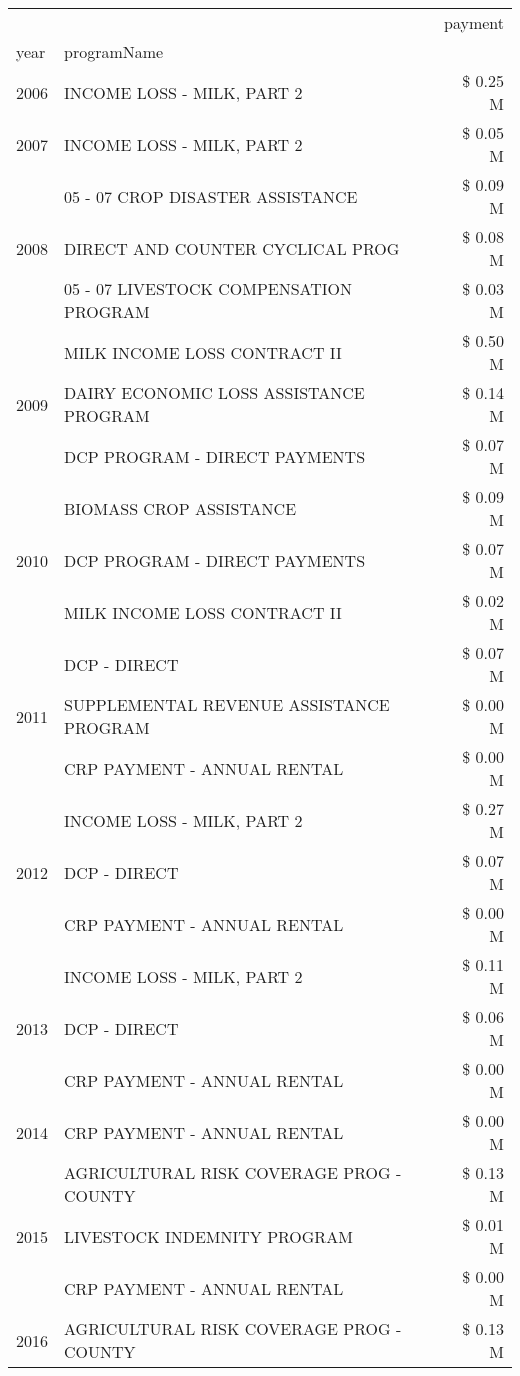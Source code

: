 \begin{tabular}{llr}
\toprule
 &  & payment \\
year & programName &  \\
\midrule
2006 & INCOME LOSS - MILK, PART 2 & \$ 0.25 M \\
\cline{1-3}
2007 & INCOME LOSS - MILK, PART 2 & \$ 0.05 M \\
\cline{1-3}
\multirow[t]{3}{*}{2008} & 05 - 07 CROP DISASTER ASSISTANCE & \$ 0.09 M \\
 & DIRECT AND COUNTER CYCLICAL PROG & \$ 0.08 M \\
 & 05 - 07 LIVESTOCK COMPENSATION PROGRAM & \$ 0.03 M \\
\cline{1-3}
\multirow[t]{3}{*}{2009} & MILK INCOME LOSS CONTRACT II & \$ 0.50 M \\
 & DAIRY ECONOMIC LOSS ASSISTANCE PROGRAM & \$ 0.14 M \\
 & DCP PROGRAM - DIRECT PAYMENTS & \$ 0.07 M \\
\cline{1-3}
\multirow[t]{3}{*}{2010} & BIOMASS CROP ASSISTANCE & \$ 0.09 M \\
 & DCP PROGRAM - DIRECT PAYMENTS & \$ 0.07 M \\
 & MILK INCOME LOSS CONTRACT II & \$ 0.02 M \\
\cline{1-3}
\multirow[t]{3}{*}{2011} & DCP - DIRECT & \$ 0.07 M \\
 & SUPPLEMENTAL REVENUE ASSISTANCE PROGRAM & \$ 0.00 M \\
 & CRP PAYMENT - ANNUAL RENTAL & \$ 0.00 M \\
\cline{1-3}
\multirow[t]{3}{*}{2012} & INCOME LOSS - MILK, PART 2 & \$ 0.27 M \\
 & DCP - DIRECT & \$ 0.07 M \\
 & CRP PAYMENT - ANNUAL RENTAL & \$ 0.00 M \\
\cline{1-3}
\multirow[t]{3}{*}{2013} & INCOME LOSS - MILK, PART 2 & \$ 0.11 M \\
 & DCP - DIRECT & \$ 0.06 M \\
 & CRP PAYMENT - ANNUAL RENTAL & \$ 0.00 M \\
\cline{1-3}
2014 & CRP PAYMENT - ANNUAL RENTAL & \$ 0.00 M \\
\cline{1-3}
\multirow[t]{3}{*}{2015} & AGRICULTURAL RISK COVERAGE PROG - COUNTY & \$ 0.13 M \\
 & LIVESTOCK INDEMNITY PROGRAM & \$ 0.01 M \\
 & CRP PAYMENT - ANNUAL RENTAL & \$ 0.00 M \\
\cline{1-3}
\multirow[t]{3}{*}{2016} & AGRICULTURAL RISK COVERAGE PROG - COUNTY & \$ 0.13 M \\

\end{tabular}
